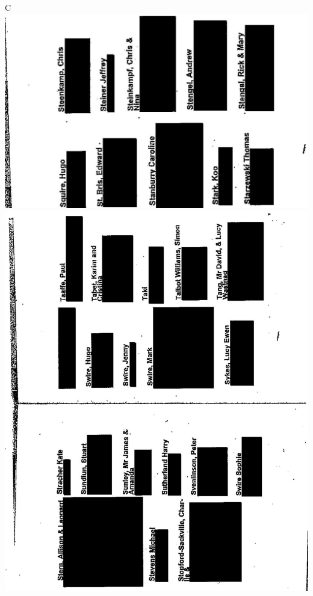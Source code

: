 \documentclass[10pt]{article}
\begin{document}
C\\
\includegraphics[max width=\textwidth, center]{2025_02_27_dd68c3d38de88f0516d9g-173}\\
\includegraphics[max width=\textwidth, center]{2025_02_27_dd68c3d38de88f0516d9g-174}\\
\end{document}
